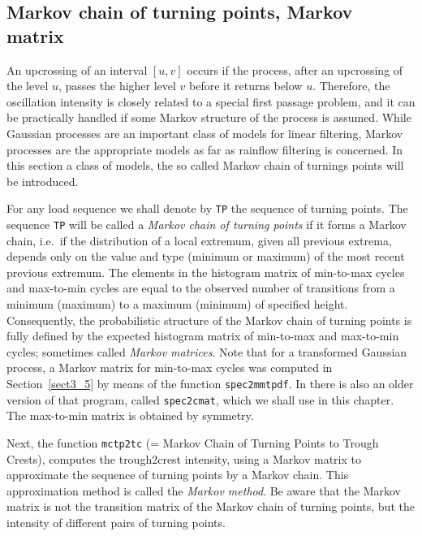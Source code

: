 \subsection{Markov chain of turning points,
Markov matrix}\label{subsec:markov_chain}
An upcrossing of an interval $[u, v]$ occurs if the process, after an
upcrossing of the level $u$, passes the higher level $v$ before it
returns below $u$. Therefore, the oscillation intensity is closely
related to a special first passage
problem, and it can be practically handled if some Markov structure
of the process is assumed. While Gaussian processes are an important
class of models for linear filtering, Markov processes are the
appropriate models as far as rainflow filtering is concerned. In this
section a class of models, the so called Markov chain of turnings
points will be introduced.

For any load sequence we shall denote by {\tt TP} the sequence of turning
points. The sequence {\tt TP} will be called a {\em Markov chain of
turning points} if it forms a Markov chain, i.e.\ if the distribution of a
local extremum, given all previous extrema,
depends only on the value and type (minimum or maximum)
of the most recent previous extremum. The
elements in the histogram matrix of min-to-max cycles and max-to-min cycles
are equal to the observed number of transitions from a minimum
(maximum) to a maximum (minimum) of specified height.
Consequently, the probabilistic structure of the Markov chain of
turning points is fully defined by the expected histogram matrix of
min-to-max and max-to-min cycles; sometimes called
{\sl Markov matrices}. Note
that for a transformed Gaussian process, a Markov matrix for min-to-max
cycles was computed in Section~\ref{sect3_5} by
means of the \progname{} function {\tt spec2mmtpdf}. In \progname{}
there is also an older
version of that program, called {\tt spec2cmat}, which we shall use in
this chapter. The max-to-min matrix is
obtained by symmetry.

Next, the function
{\tt mctp2tc}
(= Markov Chain of Turning Points to Trough Crests),
computes the trough2crest intensity,
using a Markov matrix to approximate the
sequence of turning points by a  Markov chain. This approximation
method is called the {\sl Markov method}. Be aware that the Markov matrix
is not the transition matrix of the Markov chain of turning points, but
the intensity of different pairs of turning points.

